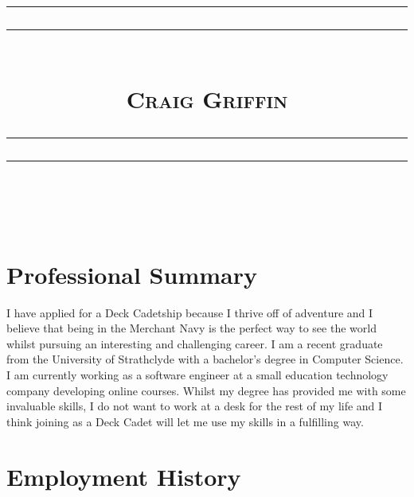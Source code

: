 \documentclass[11pt, english]{article}
\newcommand{\HRule}[1]{\rule{\linewidth}{#1}}
\begin{document}
	
	
	\title{
		\HRule{0.5pt}
		\HRule{0.5pt}\\ [0.7cm]
		\huge{\textsc{Craig Griffin}}\\[0.7cm]

		\HRule{0.5pt}
		\HRule{0.5pt}\\ [-0.45cm]
	}
	\date{}
	\maketitle
	
	

		\section{Professional Summary}
		

		
		
	
		I have applied for a Deck Cadetship because I thrive off of adventure and I believe that being in the Merchant Navy is the perfect way to see the world whilst pursuing an interesting and challenging career. I am a recent graduate from the University of Strathclyde with a bachelor's degree in Computer Science. I am currently working as a software engineer at a small education technology company developing online courses. Whilst my degree has provided me with some invaluable skills, I do not want to work at a desk for the rest of my life and I think joining as a Deck Cadet will let me use my skills in a fulfilling way.

	
	
		\section{Employment History} 
		
\end{document}
